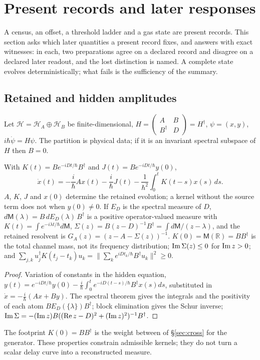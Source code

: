 \section{Present records and later responses}\label{sec:records}
A census, an offset, a threshold ladder and a gas state are present records. This section asks which later quantities a present record fixes, and answers with exact witnesses: in each, two preparations agree on a declared record and disagree on a declared later readout, and the lost distinction is named. A complete state evolves deterministically; what fails is the sufficiency of the summary.

\subsection{Retained and hidden amplitudes}
Let $\mathcal H=\mathcal H_A\oplus\mathcal H_B$ be finite-dimensional, $H=\begin{pmatrix}A&B\\B^\dagger&D\end{pmatrix}=H^\dagger$, $\psi=(x,y)$, $i\hbar\dot\psi=H\psi$. The partition is physical data; if it is an invariant spectral subspace of $H$ then $B=0$.

\begin{theorem}\label{thm:reduced}
With $K(t)=Be^{-iDt/\hbar}B^\dagger$ and $J(t)=Be^{-iDt/\hbar}y(0)$,
\[
\dot x(t)=-\frac i\hbar Ax(t)-\frac i\hbar J(t)-\frac1{\hbar^2}\int_0^tK(t-s)x(s)\,ds.
\]
$A$, $K$, $J$ and $x(0)$ determine the retained evolution; a kernel without the source term does not when $y(0)\neq0$. If $E_D$ is the spectral measure of $D$, $d\mathsf M(\lambda)=B\,dE_D(\lambda)\,B^\dagger$ is a positive operator-valued measure with $K(t)=\int e^{-i\lambda t/\hbar}d\mathsf M$, $\Sigma(z)=B(z-D)^{-1}B^\dagger=\int d\mathsf M/(z-\lambda)$, and the retained resolvent is $G_A(z)=(z-A-\Sigma(z))^{-1}$. $K(0)=\mathsf M(\mathbb R)=BB^\dagger$ is the total channel mass, not its frequency distribution; $\operatorname{Im}\Sigma(z)\le0$ for $\operatorname{Im} z>0$; and $\sum_{j,k}u_j^\dagger K(t_j-t_k)u_k=\|\sum_ke^{iDt_k/\hbar}B^\dagger u_k\|^2\ge0$. 
\end{theorem}
\begin{proof}
Variation of constants in the hidden equation, $y(t)=e^{-iDt/\hbar}y(0)-\frac i\hbar\int_0^te^{-iD(t-s)/\hbar}B^\dagger x(s)ds$, substituted in $\dot x=-\frac i\hbar(Ax+By)$. The spectral theorem gives the integrals and the positivity of each atom $BE_D(\{\lambda\})B^\dagger$; block elimination gives the Schur inverse; $\operatorname{Im}\Sigma=-(\operatorname{Im} z)B((\operatorname{Re} z-D)^2+(\operatorname{Im} z)^2)^{-1}B^\dagger$.
\end{proof}
The footprint $K(0)=BB^\dagger$ is the weight between of §\ref{sec:cross} for the generator. These properties constrain admissible kernels; they do not turn a scalar delay curve into a reconstructed measure.

